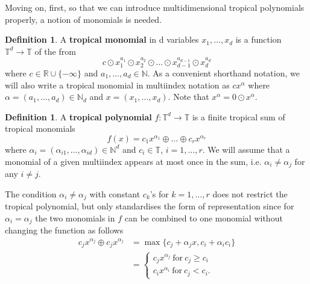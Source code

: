 \documentclass{article}
\theoremstyle{definition}
\newtheorem{definition}[theorem]{Definition}
\begin{document}
Moving on, first, so that we can introduce multidimensional tropical polynomials properly, a notion of monomials is needed.

\begin{definition}
\cite[p.~2]{zhang2018tropical}
A \textbf{tropical monomial} in d variables $x_1 , \dots , x_d$ is a function $ \mathbb{T}^{d} \to \mathbb{T} $ of the from 
$$ c \odot x_1^{a_1} \odot x_2^{a_2} \odot \dots \odot x_{d-1}^{a_{d-1}} \odot x_d^{a_d}$$
where $c \in \mathbb{R} \cup \{- \infty \}$ and $a_1, \dots , a_d \in \mathbb{N}$. As a convenient shorthand notation, we will also write a tropical monomial in multiindex notation as $cx^{\alpha}$ where $\alpha = (a_1 , \dots , a_d) \in \mathbb{N}_d$ and $x = (x_1 , \dots , x_d)$. Note that $x^{\alpha} = 0 \odot x^{\alpha}$.
\end{definition}

\begin{definition}\label{tropPolyn}
\cite[p.~2]{zhang2018tropical}
A \textbf{tropical polynomial} $f: \mathbb{T}^{d} \to \mathbb{T}$ is a finite tropical sum of tropical monomials 
$$ f(x)=c_1x^{\alpha_1} \oplus \dots \oplus c_rx^{\alpha_r}$$
where $\alpha_i = (\alpha_{i1}, \dots , \alpha_{id}) \in \mathbb{N}^{d}$ and $c_i \in \mathbb{T}$, $i = 1, \dots , r$. We will assume that a monomial of a given multiindex appears at most once in the sum, i.e. $\alpha_i \neq \alpha_j$ for any $i \neq j$.
\end{definition}

The condition $\alpha_i \neq \alpha_j$ with constant $c_{k}$'s for $k=1, \dots , r$ does not restrict the tropical polynomial, but only standardises the form of representation since for $\alpha_{i} = \alpha_{j}$ the two monomials in $f$ can be combined to one monomial without changing the function as follows 
\begin{align*}
c_jx^{\alpha_j} \oplus c_jx^{\alpha_j} 
&= \max \{ c_{j} + \alpha_{j} x , c_{i} + \alpha_{i} c_{i} \} \\
&= \begin{cases} c_{j} x^{\alpha_{j}} \ \text{for} \ c_{j} \geq c_{i}\\
c_{i} x^{\alpha_{i}} \ \text{for} \ c_{j} < c_{i}.
\end{cases}
\end{align*}
\end{document}
